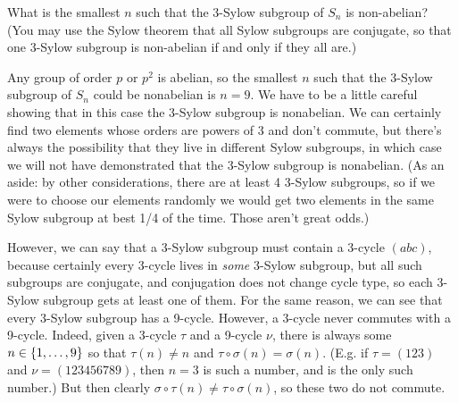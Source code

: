 \begin{question}[subtitle = August 2017 Problem 3,ID=Aug17_3]
What is the smallest $n$ such that the 3-Sylow subgroup of $S_n$ is non-abelian? (You may use the Sylow theorem that all Sylow subgroups are conjugate, so that one 3-Sylow subgroup is non-abelian if and only if they all are.)
\end{question}
\begin{solution}
Any group of order $p$ or $p^2$ is abelian, so the smallest $n$ such that the 3-Sylow subgroup of $S_n$ could be nonabelian is $n=9$. We have to be a little careful showing that in this case the 3-Sylow subgroup is nonabelian. We can certainly find two elements whose orders are powers of 3 and don't commute, but there's always the possibility that they live in different Sylow subgroups, in which case we will not have demonstrated that the 3-Sylow subgroup is nonabelian. (As an aside: by other considerations, there are at least 4 3-Sylow subgroups, so if we were to choose our elements randomly we would get two elements in the same Sylow subgroup at best 1/4 of the time. Those aren't great odds.)

However, we can say that a 3-Sylow subgroup must contain a 3-cycle $(abc)$, because certainly every 3-cycle lives in \emph{some} 3-Sylow subgroup, but all such subgroups are conjugate, and conjugation does not change cycle type, so each 3-Sylow subgroup gets at least one of them. For the same reason, we can see that every 3-Sylow subgroup has a 9-cycle. However, a 3-cycle never commutes with a 9-cycle. Indeed, given a 3-cycle $\tau$ and a 9-cycle $\nu$, there is always some $n \in \{1,\dots,9\}$ so that $\tau(n) \neq n$ and $\tau\circ \sigma(n) = \sigma(n)$. (E.g. if $\tau = (123)$ and $\nu = (123456789)$, then $n = 3$ is such a number, and is the only such number.) But then clearly $\sigma\circ \tau(n) \neq \tau\circ \sigma(n)$, so these two do not commute.
\end{solution}

